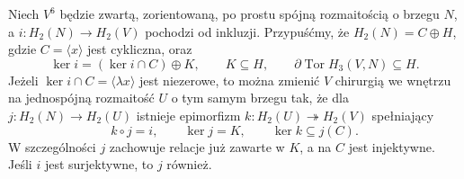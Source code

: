 \begin{lemat}
\label{lem:barden-dodanie-24}
Niech $V^6$ będzie zwartą,
zorientowaną, po prostu spójną
rozmaitością o brzegu $N$, a
$i\colon H_2(N)\to H_2(V)$ pochodzi
od inkluzji. Przypuśćmy, że
$H_2(N)=C\oplus H$, gdzie $C=\langle x\rangle$
jest cykliczna, oraz
\[
\ker i=(\ker i\cap C)\oplus K,
 \qquad K\subseteq H,
 \qquad
\partial\operatorname{Tor}H_3(V,N)
 \subseteq H.
\]
Jeżeli $\ker i\cap C=\langle\lambda x\rangle$
jest niezerowe, to można zmienić $V$
chirurgią we wnętrzu na jednospójną
rozmaitość $U$ o tym samym brzegu tak,
że dla $j\colon H_2(N)\to H_2(U)$
istnieje epimorfizm
$k\colon H_2(U)\twoheadrightarrow H_2(V)$
spełniający
\[
 k\circ j=i,\qquad
 \ker j=K,\qquad
 \ker k\subseteq j(C).
\]
W szczególności $j$ zachowuje relacje
już zawarte w $K$, a na $C$ jest
injektywne. Jeśli $i$ jest surjektywne,
to $j$ również.
\end{lemat}
